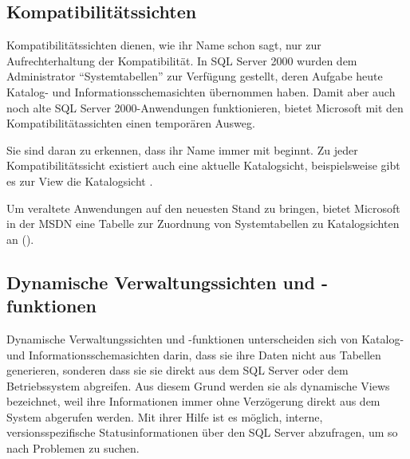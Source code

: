         \begin{literaturinternet}
          \item \cite{ms186778}
        \end{literaturinternet}
      \subsection{Kompatibilitätssichten}
        Kompatibilitätssichten dienen, wie ihr Name schon sagt, nur zur
        Aufrechterhaltung der Kompatibilität. In SQL Server 2000 wurden dem
        Administrator \enquote{Systemtabellen} zur Verfügung gestellt, deren
        Aufgabe heute Katalog- und Informationsschemasichten übernommen
        haben. Damit aber auch noch alte SQL Server 2000-Anwendungen
        funktionieren, bietet Microsoft mit den Kompatibilitätassichten einen
        temporären Ausweg.
        
        Sie sind daran zu erkennen, dass ihr Name immer mit
         beginnt. Zu jeder Kompatibilitätssicht existiert
        auch eine aktuelle Katalogsicht, beispielsweise gibt es zur View
         die Katalogsicht
        .
        
        Um veraltete Anwendungen auf den neuesten Stand zu bringen, bietet
        Microsoft in der MSDN eine Tabelle zur Zuordnung von Systemtabellen zu
        Katalogsichten an (\parencite{ms187997}).
        
        \begin{literaturinternet}
          \item \cite{ms187376}
        \end{literaturinternet}
      \subsection{Dynamische Verwaltungssichten und -funktionen}
        Dynamische Verwaltungssichten und -funktionen unterscheiden sich von
        Katalog- und Informationsschemasichten darin, dass sie ihre Daten
        nicht aus Tabellen generieren, sonderen dass sie sie direkt aus dem
        SQL Server oder dem Betriebssystem abgreifen. Aus diesem Grund werden
        sie als dynamische Views bezeichnet, weil ihre Informationen immer
        ohne Verzögerung direkt aus dem System abgerufen werden. Mit ihrer
        Hilfe ist es möglich, interne, versionsspezifische Statusinformationen
        über den SQL Server abzufragen, um so nach Problemen zu suchen.
        
